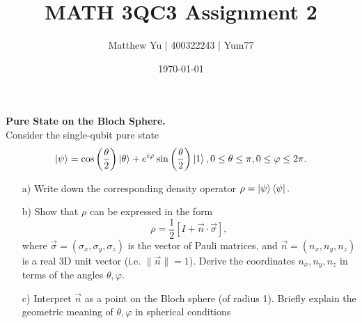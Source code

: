 \documentclass{article}
\renewcommand{\phi}{\varphi}
\begin{document}
\title{MATH 3QC3 Assignment 2}
\author{Matthew Yu | 400322243 | Yum77}
\date{\today}
\maketitle

\begin{question}
    \textbf{Pure State on the Bloch Sphere.}\\
    Consider the single-qubit pure state $$\ket{\psi}=\cos \left( \frac{\theta}{2} \right) \ket{\theta} + e^{i\phi}\sin \left(\frac{\theta}{2} \right) \ket{1},    0 \leq \theta \leq \pi , 0 \leq \phi \leq 2\pi.$$
    \begin{enumerate}
        \item[a)] Write down the corresponding density operator $\rho=\ket{\psi}\bra{\psi}.$
        \item[b)] Show that $\rho$ can be expressed in the form $$\rho=\frac{1}{2}\left[I + \vec{n} \cdot \vec{\sigma} \right],$$ where $\vec{\sigma}=(\sigma_x,\sigma_y,\sigma_z)$ is the vector of Pauli matrices, and $\vec{n}=(n_x,n_y,n_z)$ is a real 3D unit vector (i.e. $\|\vec{n}\|=1$). Derive the coordinates $n_x,n_y,n_z$ in terms of the angles $\theta, \phi$.
        \item[c)] Interpret $\vec{n}$ as a point on the Bloch sphere (of radius 1). Briefly explain the geometric meaning of $\theta,\phi$ in spherical conditions 
    \end{enumerate}
\end{question}
\end{document}
